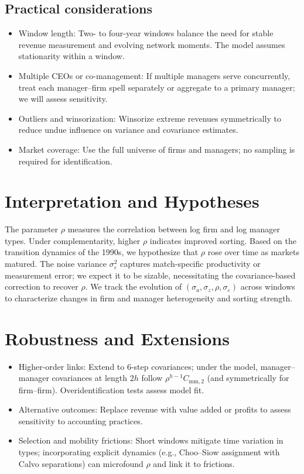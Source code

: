\documentclass[11pt]{article}
\begin{document}
\subsection{Practical considerations}
\begin{itemize}
  \item Window length: Two- to four-year windows balance the need for stable revenue measurement and evolving network moments. The model assumes stationarity within a window.
  \item Multiple CEOs or co-management: If multiple managers serve concurrently, treat each manager--firm spell separately or aggregate to a primary manager; we will assess sensitivity.
  \item Outliers and winsorization: Winsorize extreme revenues symmetrically to reduce undue influence on variance and covariance estimates.
  \item Market coverage: Use the full universe of firms and managers; no sampling is required for identification.
\end{itemize}

\section{Interpretation and Hypotheses}
The parameter $\rho$ measures the correlation between log firm and log manager types. Under complementarity, higher $\rho$ indicates improved sorting. Based on the transition dynamics of the 1990s, we hypothesize that $\rho$ rose over time as markets matured. The noise variance $\sigma_\varepsilon^2$ captures match-specific productivity or measurement error; we expect it to be sizable, necessitating the covariance-based correction to recover $\rho$. We track the evolution of $(\sigma_a, \sigma_z, \rho, \sigma_\varepsilon)$ across windows to characterize changes in firm and manager heterogeneity and sorting strength.

\section{Robustness and Extensions}
\begin{itemize}
  \item Higher-order links: Extend to 6-step covariances; under the model, manager--manager covariances at length $2h$ follow $\rho^{h-1} C_{\text{mm},2}$ (and symmetrically for firm--firm). Overidentification tests assess model fit.
  \item Alternative outcomes: Replace revenue with value added or profits to assess sensitivity to accounting practices.
  \item Selection and mobility frictions: Short windows mitigate time variation in types; incorporating explicit dynamics (e.g., Choo--Siow assignment with Calvo separations) can microfound $\rho$ and link it to frictions.
\end{itemize}
\end{document}

